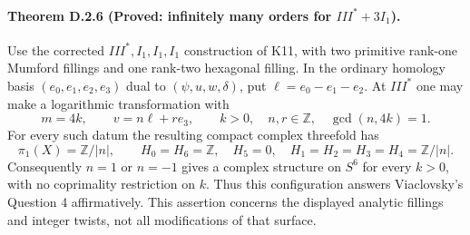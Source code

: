 \paragraph{Theorem D.2.6 (Proved: infinitely many orders for $III^*+3I_1$).}
Use the corrected $III^*,I_1,I_1,I_1$ construction of K11, with
two primitive rank-one Mumford fillings and one rank-two hexagonal
filling. In the ordinary homology basis $(e_0,e_1,e_2,e_3)$ dual
to $(\psi,u,w,\delta)$, put $\ell=e_0-e_1-e_2$.
At $III^*$ one may make a logarithmic transformation with
\[
 m=4k,\qquad v=n\ell+r e_3,\qquad
 k>0,\quad n,r\in\mathbb Z,\quad \gcd(n,4k)=1.
\]
For every such datum the resulting compact complex threefold has
\[
 \pi_1(X)=\mathbb Z/|n|,\qquad
 H_0=H_6=\mathbb Z,\quad H_5=0,\quad
 H_1=H_2=H_3=H_4=\mathbb Z/|n|.
\]
Consequently $n=1$ or $n=-1$ gives a complex structure on $S^6$
for every $k>0$, with no coprimality restriction on $k$.
Thus this configuration answers Viaclovsky's Question 4
affirmatively. This assertion concerns the displayed analytic
fillings and integer twists, not all modifications of that surface.
